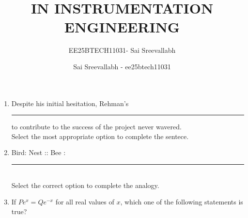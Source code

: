 \documentclass[journal,12pt,onecolumn]{IEEEtran}
\title{IN  INSTRUMENTATION ENGINEERING}
\author{EE25BTECH11031- Sai Sreevallabh}
\author{Sai Sreevallabh - ee25btech11031}
\theoremstyle{remark}
\begin{document}
\maketitle

\begin{enumerate}

\item Despite his initial hesitation, Rehman's \rule{1.5cm}{0.4pt} to contribute to the success of the project never wavered.\\
Select the most appropriate option to complete the sentece. 
\par\hfill{}
\begin{enumerate}
\end{enumerate}

\item Bird: Nest :: Bee : \rule{1.5cm}{0.4pt}\\
Select the correct option to complete the analogy.
\par\hfill{}
\begin{enumerate}
\end{enumerate}

\item If $P e^x = Q e^{-x}$ for all real values of $x$, which one of the following statements is true?
\par\hfill{}
\begin{enumerate}
\end{enumerate}


\end{enumerate}
\end{document}
